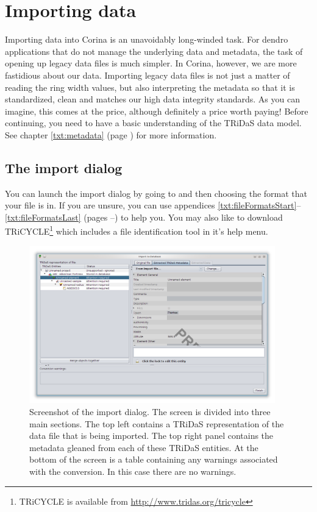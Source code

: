\section{Importing data}
Importing data into Corina is an unavoidably long-winded task.  For dendro applications that do not manage the underlying data and metadata, the task of opening up legacy data files is much simpler.  In Corina, however, we are more fastidious about our data.  Importing legacy data files is not just a matter of reading the ring width values, but also interpreting the metadata so that it is standardized, clean and matches our high data integrity standards.  As you can imagine, this comes at the price, although definitely a price worth paying!  Before continuing, you need to have a basic understanding of the TRiDaS data model.  See chapter \ref{txt:metadata} (page \pageref{txt:metadata}) for more information.


\subsection{The import dialog}
You can launch the import dialog by going to  and then choosing the format that your file is in.  If you are unsure, you can use appendices \ref{txt:fileFormatsStart}--\ref{txt:fileFormatsLast} (pages \pageref{txt:fileFormatsStart}--\pageref{txt:fileFormatsEnd}) to help you.  You may also like to download TRiCYCLE\footnote{TRiCYCLE is available from \url{http://www.tridas.org/tricycle}} which includes a file identification tool in it's help menu.

\begin{figure}[htbp]
  \centering
    \includegraphics[width=0.95\textwidth]{Images/importdata1.png}
    \caption{Screenshot of the import dialog.  The screen is divided into three main sections.  The top left contains a TRiDaS representation of the data file that is being imported.  The top right panel contains the metadata gleaned from each of these TRiDaS entities.  At the bottom of the screen is a table containing any warnings associated with the conversion.  In this case there are no warnings. }
    \label{fig:import}
\end{figure}

